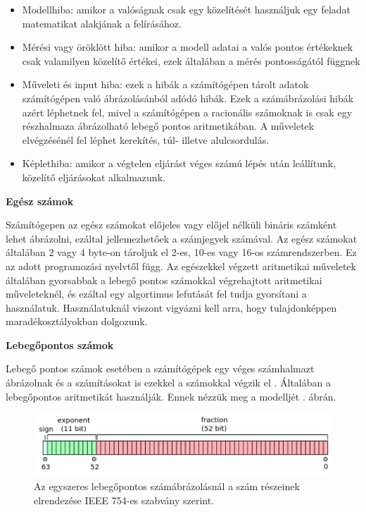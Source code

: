 \begin{itemize}
\item
  Modellhiba: amikor a valóságnak csak egy közelítését használjuk egy
  feladat matematikat alakjának a felírásához.
\item
  Mérési vagy öröklött hiba: amikor a modell adatai a valós pontos
  értékeknek csak valamilyen közelítő értékei, ezek általában a mérés
  pontosságától függnek
\item
  Műveleti és input hiba: ezek a hibák a számítógépen tárolt adatok
  számítógépen való ábrázolásánból adódó hibák. Ezek a számábrázolási
  hibák azért léphetnek fel, mivel a számítógépen a racionális számoknak
  is csak egy részhalmaza ábrázolható lebegő pontos aritmetikában. A
  műveletek elvégzésénél fel léphet kerekítés, túl- illetve
  alulcsordulás.
\item
  Képlethiba: amikor a végtelen eljárást véges számú lépés után
  leállítunk, közelítő eljárásokat alkalmazunk.
\end{itemize}


\bigskip

\noindent\textbf{Egész számok}

\medskip

Számítógepen az egész számokat előjeles vagy előjel nélküli bináris
számként lehet ábrázolni, ezáltal jellemezhetőek a számjegyek számával.
Az egész számokat általában 2 vagy 4 byte-on tároljuk el 2-es, 10-es vagy
16-os számrendszerben. Ez az adott programozási nyelvtől függ. Az
egészekkel végzett aritmetikai műveletek általában gyorsabbak a lebegő pontos
számokkal végrehajtott aritmetikai műveleteknél, és ezáltal egy
algortimus lefutását fel tudja gyorsítani a használatuk. Használatuknál viszont
vigyázni kell arra, hogy tulajdonképpen maradékosztályokban dolgozunk.

\bigskip

\noindent\textbf{Lebegőpontos számok}

\medskip

Lebegő pontos számok esetében a számítógépek egy véges számhalmazt
ábrázolnak és a számításokat is ezekkel a számokkal végzik el \cite{ieee}.
Általában a lebegőpontos aritmetikát használják. Ennek nézzük meg a modelljét . ábrán.

\begin{figure}[h!]
\centering
\includegraphics[width=\textwidth]{img/ieee.png}
\caption{Az egyszeres lebegőpontos számábrázolásnál a szám részeinek elrendezése IEEE 754-es szabvány szerint.}
\label{fig:ieee}
\end{figure}

